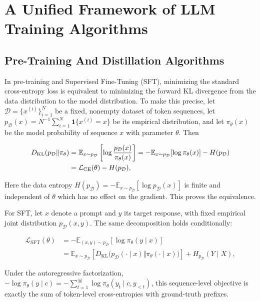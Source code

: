 \section{A Unified Framework of LLM Training Algorithms}

\subsection{Pre-Training And Distillation Algorithms}

In pre-training and Supervised Fine-Tuning (SFT), minimizing the standard cross-entropy loss is equivalent to minimizing the forward KL divergence from the data distribution to the model distribution. To make this precise, let $\mathcal{D}=\{x^{(i)}\}_{i=1}^N$ be a fixed, nonempty dataset of token sequences, let $p_{\mathcal{D}}(x)=N^{-1}\sum_{i=1}^N\mathbf{1}\{x^{(i)}=x\}$ be its empirical distribution, and let $\pi_\theta(x)$ be the model probability of sequence $x$ with parameter $\theta$. Then

\begin{align}
 D_{\mathrm{KL}}(p_{\mathcal{D}}\Vert\pi_\theta)
 &= \mathbb{E}_{x\sim p_{\mathcal{D}}}
    \left[\log\frac{p_{\mathcal{D}}(x)}{\pi_\theta(x)}\right] \notag = -\mathbb{E}_{x\sim p_{\mathcal{D}}}[\log\pi_\theta(x)]
    -H(p_{\mathcal{D}}) \notag\\
 &= \mathcal{L}_{\mathrm{CE}}(\theta)-H(p_{\mathcal{D}}),
 \label{eq:ce-forward-kl}
\end{align}

Here the data entropy $H(p_{\mathcal{D}})=-\mathbb{E}_{x\sim p_{\mathcal{D}}} [\log p_{\mathcal{D}}(x)]$ is finite and independent of $\theta$ which has no effect on the gradient. This proves the equivalence.

For SFT, let $x$ denote a prompt and $y$ its target response, with fixed empirical joint distribution $p_{\mathcal{D}}(x,y)$. The same decomposition holds conditionally:

\begin{align}
  \mathcal{L}_{\mathrm{SFT}}(\theta) &= 
  -\mathbb{E}_{(x,y)\sim p_{\mathcal{D}}}
  [\log\pi_\theta(y\mid x)]\\
  &=\mathbb{E}_{x\sim p_{\mathcal{D}}}
 \left[D_{\mathrm{KL}}\bigl(p_{\mathcal{D}}(\cdot\mid x)
 \Vert\pi_\theta(\cdot\mid x)\bigr)\right]
 +H_{p_{\mathcal{D}}}(Y\mid X),
 \label{eq:sft-conditional-kl}
\end{align}

Under the autoregressive factorization,
$-\log\pi_\theta(y\mid c)=-\sum_{t=1}^{|y|}
\log\pi_\theta(y_t\mid c,y_{<t})$, this sequence-level objective is exactly the sum of token-level
cross-entropies with ground-truth prefixes.

